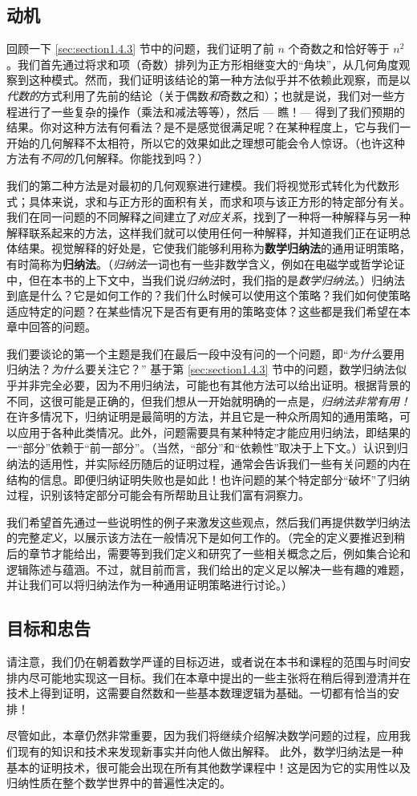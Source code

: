 \subsection{动机}

回顾一下 \ref{sec:section1.4.3} 节中的问题，我们证明了前 $n$ 个奇数之和恰好等于 $n^2$。我们首先通过将求和项（奇数）排列为正方形相继变大的“角块”，从几何角度观察到这种模式。然而，我们证明该结论的第一种方法似乎并不依赖此观察，而是以\textit{代数的}方式利用了先前的结论（关于偶数\textit{和}奇数之和）；也就是说，我们对一些方程进行了一些复杂的操作（乘法和减法等等），然后 --- 瞧！--- 得到了我们预期的结果。你对这种方法有何看法？是不是感觉很满足呢？在某种程度上，它与我们一开始的几何解释不太相符，所以它的效果如此之理想可能会令人惊讶。（也许这种方法有\textit{不同的}几何解释。你能找到吗？）

我们的第二种方法是对最初的几何观察进行建模。我们将视觉形式转化为代数形式；具体来说，求和与正方形的面积有关，而求和项与该正方形的特定部分有关。我们在同一问题的不同解释之间建立了\textit{对应关系}，找到了一种将一种解释与另一种解释联系起来的方法，这样我们就可以使用任何一种解释，并知道我们正在证明总体结果。视觉解释的好处是，它使我们能够利用称为\textbf{数学归纳法}的通用证明策略，有时简称为\textbf{归纳法}。（\textit{归纳法}一词也有一些非数学含义，例如在电磁学或哲学论证中，但在本书的上下文中，当我们说\textit{归纳法}时，我们指的是\textit{数学归纳法}。）归纳法到底是什么？它是如何工作的？我们什么时候可以使用这个策略？我们如何使策略适应特定的问题？在某些情况下是否有更有用的策略变体？这些都是我们希望在本章中回答的问题。

我们要谈论的第一个主题是我们在最后一段中没有问的一个问题，即“\textit{为什么}要用归纳法？\textit{为什么}要关注它？” 基于第 \ref{sec:section1.4.3} 节中的问题，数学归纳法似乎并非完全必要，因为不用归纳法，可能也有其他方法可以给出证明。根据背景的不同，这很可能是正确的，但我们想从一开始就明确的一点是，\textit{归纳法非常有用！}在许多情况下，归纳证明是最简明的方法，并且它是一种众所周知的通用策略，可以应用于各种此类情况。此外，问题需要具有某种特定才能应用归纳法，即结果的一“部分”依赖于“前一部分”。（当然，“部分”和“依赖性”取决于上下文。）认识到归纳法的适用性，并实际经历随后的证明过程，通常会告诉我们一些有关问题的内在结构的信息。即便归纳证明失败也是如此！也许问题的某个特定部分“破坏”了归纳过程，识别该特定部分可能会有所帮助且让我们富有洞察力。

我们希望首先通过一些说明性的例子来激发这些观点，然后我们再提供数学归纳法的完整\textit{定义}，以展示该方法在一般情况下是如何工作的。（完全的定义要推迟到稍后的章节才能给出，需要等到我们定义和研究了一些相关概念之后，例如集合论和逻辑陈述与蕴涵。不过，就目前而言，我们给出的定义足以解决一些有趣的难题，并让我们可以将归纳法作为一种通用证明策略进行讨论。）

\subsection{目标和忠告}

请注意，我们仍在朝着数学严谨的目标迈进，或者说在本书和课程的范围与时间安排内尽可能地实现这一目标。我们在本章中提出的一些主张将在稍后得到澄清并在技术上得到证明，这需要自然数和一些基本数理逻辑为基础。一切都有恰当的安排！

尽管如此，本章仍然非常重要，因为我们将继续介绍解决数学问题的过程，应用我们现有的知识和技术来发现新事实并向他人做出解释。 此外，数学归纳法是一种基本的证明技术，很可能会出现在所有其他数学课程中！这是因为它的实用性以及归纳性质在整个数学世界中的普遍性决定的。